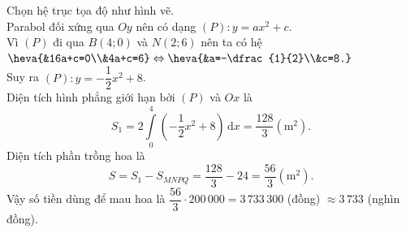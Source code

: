 \begin{bt}
{\begin{center}
		\end{center}
			Chọn hệ trục tọa độ như hình vẽ.\\
			Parabol đối xứng qua $Oy$ nên có dạng $(P)\colon y=ax^2+c$.\\
			Vì $(P)$ đi qua $B(4;0)$ và $N(2;6)$ nên ta có hệ $\heva{&16a+c=0\\&4a+c=6}\Leftrightarrow \heva{&a=-\dfrac{1}{2}\\&c=8.}$\\
			Suy ra $(P)\colon y=-\dfrac{1}{2}x^2+8$.\\
			Diện tích hình phẳng giới hạn bởi $(P)$ và $Ox$ là
			$$S_1=2\displaystyle\int\limits_{0}^{4} {\left(-\dfrac{1}{2}x^2+8\right)}\mathrm{\,d}x=\dfrac{128}{3} (\text{m}^2).$$
			Diện tích phần trồng hoa là $$S=S_1-S_{MNPQ}=\dfrac{128}{3}-24=\dfrac{56}{3}(\text{m}^2).$$
			Vậy số tiền dùng để mau hoa là $\dfrac{56}{3}\cdot 200\,000=3\,733\,300$ (đồng) $\approx 3\,733$ (nghìn đồng).
	}
\end{bt}


